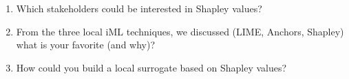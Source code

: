 
\begin{itemize}
\begin{enumerate}
\item Which stakeholders could be interested in Shapley values?
\item From the three local iML techniques, we discussed (LIME, Anchors, Shapley) what is your favorite (and why)?
\item How could you build a local surrogate based on Shapley values?
\end{enumerate}

\end{itemize}

